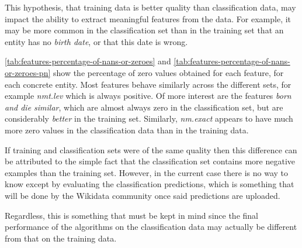 \documentclass[epsfig,a4paper,11pt,titlepage,twoside,openany]{book}
\begin{document}
This hypothesis, that training data is better quality than classification data, may impact the ability to extract meaningful features from the data. For example, it may be more common in the classification set than in the training set that an entity has no \textit{birth date}, or that this date is wrong.

\autoref{tab:features-percentage-of-nans-or-zeroes} and \autoref{tab:features-percentage-of-nans-or-zeroes-pn} show the percentage of zero values obtained for each feature, for each concrete entity. Most features behave similarly across the different sets, for example \textit{nmt.lev} which is always positive. Of more interest are the features \textit{born and die similar}, which are almost always zero in the classification set, but are considerably \textit{better} in the training set. Similarly, \textit{nm.exact} appears to have much more zero values in the classification data than in the training data.

If training and classification sets were of the same quality then this difference can be attributed to the simple fact that the classification set contains more negative examples than the training set. However, in the current case there is no way to know except by evaluating the classification predictions, which is something that will be done by the Wikidata community once said predictions are uploaded. 

Regardless, this is something that must be kept in mind since the final performance of the algorithms on the classification data may actually be different from that on the training data. 
\end{document}
